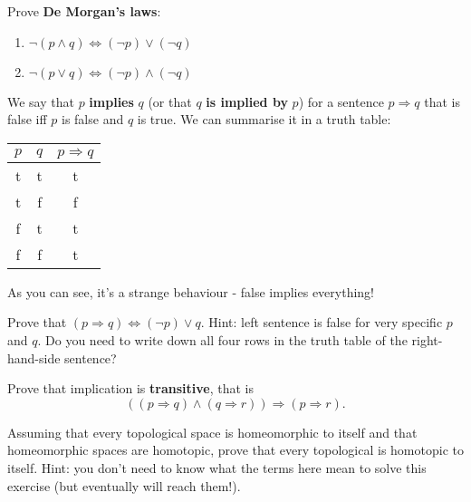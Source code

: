 \begin{exercise}
  Prove \textbf{De Morgan's laws}:
  \begin{enumerate}
    \item $\neg (p\wedge q) \Leftrightarrow (\neg p)\vee (\neg q)$
    \item $\neg (p\vee q) \Leftrightarrow (\neg p)\wedge (\neg q)$
  \end{enumerate}
\end{exercise}

\begin{definition}
  We say that $p$ \textbf{implies} $q$ (or that $q$ \textbf{is implied by} $p$) for a sentence $p\Rightarrow q$ that is false iff $p$ is false and $q$ is true.
  We can summarise it in a truth table:
  \begin{center}
    \begin{tabular}{ c  c  c }
      $p$ & $q$ & $p\Rightarrow q$ \\
      \hline
      t  &  t &        t     \\
      t  &  f &        f     \\
      f  &  t &        t     \\
      f  &  f &        t     \\
    \end{tabular}
  \end{center}
  As you can see, it's a strange behaviour - false implies everything!
\end{definition}

\begin{exercise}
  Prove that $(p\Rightarrow q)\Leftrightarrow (\neg p) \vee q$. Hint: left sentence is false for very specific $p$ and $q$. Do you need to write down all four rows in the truth table of the right-hand-side sentence?
\end{exercise}

\begin{exercise}
  Prove that implication is \textbf{transitive}, that is $$((p\Rightarrow q)\wedge (q\Rightarrow r)) \Rightarrow (p\Rightarrow r).$$
\end{exercise}

\begin{exercise}
  Assuming that every topological space is homeomorphic to itself and that homeomorphic spaces are homotopic, prove that every topological is homotopic to itself. Hint: you don't need to know what the terms here mean to solve this exercise (but eventually will reach them!).
\end{exercise}

